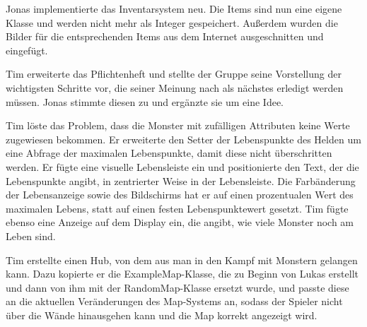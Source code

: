 
Jonas implementierte das Inventarsystem neu. Die Items sind nun eine eigene Klasse und werden nicht mehr als Integer gespeichert. Außerdem wurden die Bilder für die entsprechenden Items aus dem Internet ausgeschnitten und eingefügt. \\


Tim erweiterte das Pflichtenheft und stellte der Gruppe seine Vorstellung der wichtigsten Schritte vor, die seiner Meinung nach als nächstes erledigt werden müssen. Jonas stimmte diesen zu und ergänzte sie um eine Idee. \\


Tim löste das Problem, dass die Monster mit zufälligen Attributen keine Werte zugewiesen bekommen. Er erweiterte den Setter der Lebenspunkte des Helden um eine Abfrage der maximalen Lebenspunkte, damit diese nicht überschritten werden. Er fügte eine visuelle Lebensleiste ein und positionierte den Text, der die Lebenspunkte angibt, in zentrierter Weise in der Lebensleiste. Die Farbänderung der Lebensanzeige sowie des Bildschirms hat er auf einen prozentualen Wert des maximalen Lebens, statt auf einen festen Lebenspunktewert gesetzt. Tim fügte ebenso eine Anzeige auf dem Display ein, die angibt, wie viele Monster noch am Leben sind. \\


Tim erstellte einen \glqq{}Hub\grqq{}, von dem aus man in den Kampf mit Monstern gelangen kann. Dazu kopierte er die ExampleMap-Klasse, die zu Beginn von Lukas erstellt und dann von ihm mit der RandomMap-Klasse ersetzt wurde, und passte diese an die aktuellen Veränderungen des Map-Systems an, sodass der Spieler nicht über die Wände hinausgehen kann und die Map korrekt angezeigt wird. \\


